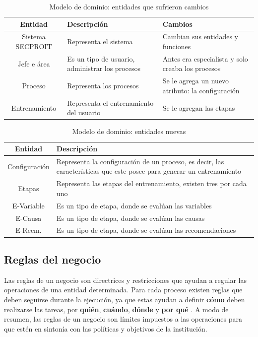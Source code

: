 \begin{table}[H]
\begin{center}
\begin{tabular}{ | c | p{5cm} |  p{5cm} | }
\hline
\textbf{Entidad} & \textbf{Descripción} & \textbf{Cambios}\\
\hline
Sistema SECPROIT & Representa el sistema & Cambian sus entidades y funciones \\
\hline
Jefe e área & Es un tipo de usuario, administrar los procesos & Antes era especialista y solo creaba los procesos \\
\hline
Proceso & Representa los procesos & Se le agrega un nuevo atributo: la configuración \\
\hline
Entrenamiento & Representa el entrenamiento del usuario & Se le agregan las etapas \\
\hline
\end{tabular}
\caption{Modelo de dominio: entidades que sufrieron cambios}
\label{tab:ent-amarilla}
\end{center}
\end{table}

\begin{table}[t]
\begin{center}
\begin{tabular}{ | c | p{10cm} | }
\hline
\textbf{Entidad} & \textbf{Descripción} \\
\hline
Configuración & Representa la configuración de un proceso, es decir, las características que este posee para generar un entrenamiento \\
\hline
Etapas & Representa las etapas del entrenamiento, existen tres por cada uno \\
\hline
E-Variable & Es un tipo de etapa, donde se evalúan las variables \\
\hline
E-Causa & Es un tipo de etapa, donde se evalúan las causas \\
\hline
E-Recm. & Es un tipo de etapa, donde se evalúan las recomendaciones \\
\hline
\end{tabular}
\caption{Modelo de dominio: entidades nuevas}
\label{tab:ent-verde}
\end{center}
\end{table}

\subsection{Reglas del negocio}
Las reglas de un negocio son directrices y restricciones que ayudan a regular las operaciones de una entidad determinada. Para cada proceso existen reglas que deben seguirse durante la ejecución, ya que estas ayudan a definir \textbf{cómo} deben realizarse las tareas, por \textbf{quién}, \textbf{cuándo}, \textbf{dónde} y \textbf{por qué} \cite{Chisholm2007}. A modo de resumen, las reglas de un negocio son límites impuestos a las operaciones para que estén en sintonía con las políticas y objetivos de la institución.

